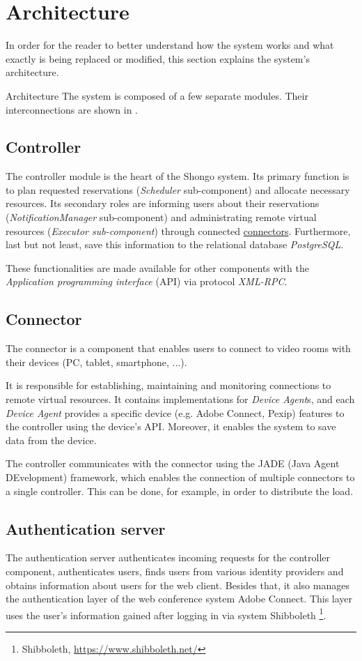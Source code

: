 \section{Architecture}
In order for the reader to better understand how the system works and what exactly is being replaced or modified, this section explains the system's architecture.

Architecture 
The system is composed of a few separate modules. Their interconnections are shown in .

\subsection{Controller} \label{controller}
The controller module is the heart of the Shongo system. Its primary function is to plan requested reservations (\emph{Scheduler} sub-component) and allocate necessary resources. Its secondary roles are informing users about their reservations (\emph{NotificationManager} sub-component) and administrating remote virtual resources (\emph{Executor sub-component}) through connected \hyperref[connector]{connectors}. Furthermore, last but not least, save this information to the relational database \emph{PostgreSQL}.

These functionalities are made available for other components with the \emph{Application programming interface} (API) via protocol \emph{XML-RPC}.

\subsection{Connector} \label{connector}
The connector is a component that enables users to connect to video rooms with their devices (PC, tablet, smartphone, ...).

It is responsible for establishing, maintaining and monitoring connections to remote virtual resources.
It contains implementations for \emph{Device Agent}s, and each \emph{Device Agent} provides a specific device (e.g. Adobe Connect, Pexip) features to the controller using the device’s API.
Moreover, it enables the system to save data from the device.

The controller communicates with the connector using the JADE (Java Agent DEvelopment) framework, which enables the connection of multiple connectors to a single controller. This can be done, for example, in order to distribute the load.

\subsection{Authentication server}
The authentication server authenticates incoming requests for the controller component, authenticates users, finds users from various identity providers and obtains information about users for the web client.
Besides that, it also manages the authentication layer of the web conference system Adobe Connect. This layer uses the user's information gained after logging in via system Shibboleth \footnote{Shibboleth, \url{https://www.shibboleth.net/}}.

